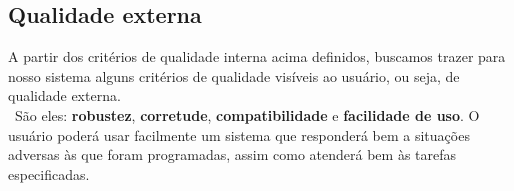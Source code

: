 \documentclass[a4paper]{article}
\begin{document}
\subsection{Qualidade externa}
A partir dos critérios de qualidade interna acima definidos, buscamos trazer para nosso sistema alguns critérios de qualidade visíveis ao usuário, ou seja, de qualidade externa. \\\
São eles: \textbf{robustez}, \textbf{corretude}, \textbf{compatibilidade} e \textbf{facilidade de uso}.
O usuário poderá usar facilmente um sistema que responderá bem a situações adversas às que foram programadas, assim como atenderá bem às tarefas especificadas.
\end{document}
